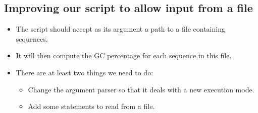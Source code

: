 \documentclass[aspectratio=1610,slidestop]{beamer}
\begin{document}
\subsection{Improving our script to allow input from a file}
\begin{pframe}
 \begin{itemize}
  \item The script should accept as its argument a path to a file containing sequences.
  \item It will then compute the GC percentage for each sequence in this file.
  \item There are at least two things we need to do:
  \begin{itemize}
   \item Change the argument parser so that it deals with a new execution mode.
   \item Add some statements to read from a file.
  \end{itemize}
 \end{itemize}
\end{pframe}

\end{document}
